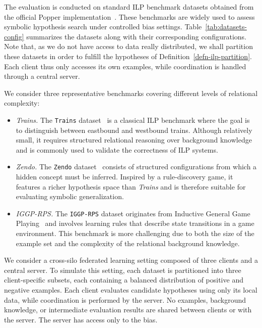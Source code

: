 \noindent
The evaluation is conducted on standard ILP benchmark datasets obtained from the official Popper implementation~\cite{popperv110}. These benchmarks are widely used to assess symbolic hypothesis search under controlled bias settings. Table~\ref{tab:datasets-config} summarizes the datasets along with their corresponding configurations. Note that, as we do not have access to data really distributed, we shall partition these datasets in order to fulfill the hypotheses of Definition~\ref{defn-ilp-partition}. Each client thus only accesses its own examples, while coordination is handled through a central server. 


We consider three representative benchmarks covering different levels of relational complexity:

\begin{itemize}

\item \textit{Trains.}  
The \texttt{Trains} dataset~\cite{larson1977inductive} is a classical ILP benchmark where the goal is to distinguish between eastbound and westbound trains. Although relatively small, it requires structured relational reasoning over background knowledge and is commonly used to validate the correctness of ILP systems.

\item \textit{Zendo.}  
The \texttt{Zendo} dataset~\cite{bramley2018grounding} consists of structured configurations from which a hidden concept must be inferred. Inspired by a rule-discovery game, it features a richer hypothesis space than \textit{Trains} and is therefore suitable for evaluating symbolic generalization.

\item \textit{IGGP-RPS.}  
The \texttt{IGGP-RPS} dataset originates from Inductive General Game Playing~\cite{cropper2020inductive} and involves learning rules that describe state transitions in a game environment. This benchmark is more challenging due to both the size of the example set and the complexity of the relational background knowledge.

\end{itemize}

\noindent
We consider a cross-silo federated learning setting composed of three clients and a central server. To simulate this setting, each dataset is partitioned into three client-specific subsets, each containing a balanced distribution of positive and negative examples.
Each client evaluates candidate hypotheses using only its local data, while coordination is performed by the server. No examples, background knowledge, or intermediate evaluation results are shared between clients or with the server. The server has access only to the bias.


